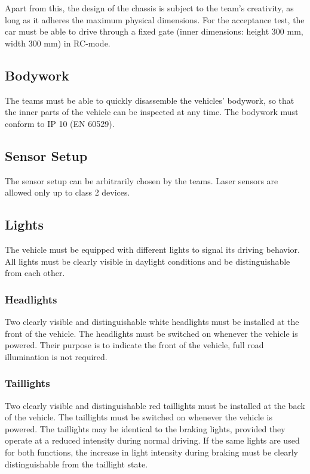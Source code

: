 Apart from this, the design of the chassis is subject to the team’s creativity, as long as it adheres the maximum physical dimensions.
For the acceptance test, the car must be able to drive through a fixed gate (inner dimensions: height 300 mm, width 300 mm) in RC-mode.

\subsection{Bodywork}

The teams must be able to quickly disassemble the vehicles’ bodywork, so that the inner parts of the vehicle can be inspected at any time.
The bodywork must conform to IP 10 (EN 60529).

\subsection{Sensor Setup}

The sensor setup can be arbitrarily chosen by the teams.
Laser sensors are allowed only up to class 2 devices.

\subsection{Lights}

The vehicle must be equipped with different lights to signal its driving behavior.
All lights must be clearly visible in daylight conditions and be distinguishable from each other.

    \subsubsection{Headlights}

    Two clearly visible and distinguishable white headlights must be installed at the front of the vehicle.
    The headlights must be switched on whenever the vehicle is powered.
    Their purpose is to indicate the front of the vehicle, full road illumination is not required.

    \subsubsection{Taillights}

    Two clearly visible and distinguishable red taillights must be installed at the back of the vehicle.
    The taillights must be switched on whenever the vehicle is powered.
    The taillights may be identical to the braking lights, provided they operate at a reduced intensity during normal driving.
    If the same lights are used for both functions, the increase in light intensity during braking must be clearly distinguishable from the taillight state.

